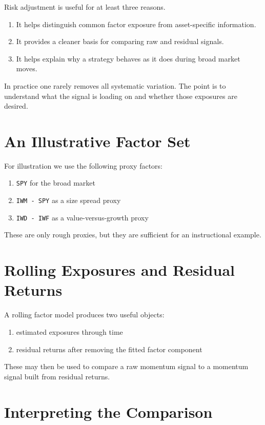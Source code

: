 \documentclass[11pt]{article}
\begin{document}
Risk adjustment is useful for at least three reasons.

\begin{enumerate}
  \item It helps distinguish common factor exposure from asset-specific information.
  \item It provides a cleaner basis for comparing raw and residual signals.
  \item It helps explain why a strategy behaves as it does during broad market moves.
\end{enumerate}

In practice one rarely removes all systematic variation. The point is to
understand what the signal is loading on and whether those exposures are
desired.

\section*{An Illustrative Factor Set}

For illustration we use the following proxy factors:

\begin{enumerate}
  \item \texttt{SPY} for the broad market
  \item \texttt{IWM - SPY} as a size spread proxy
  \item \texttt{IWD - IWF} as a value-versus-growth proxy
\end{enumerate}

These are only rough proxies, but they are sufficient for an instructional
example.

\newpage

\section*{Rolling Exposures and Residual Returns}

A rolling factor model produces two useful objects:

\begin{enumerate}
  \item estimated exposures through time
  \item residual returns after removing the fitted factor component
\end{enumerate}

These may then be used to compare a raw momentum signal to a momentum signal
built from residual returns.

\section*{Interpreting the Comparison}
\end{document}
